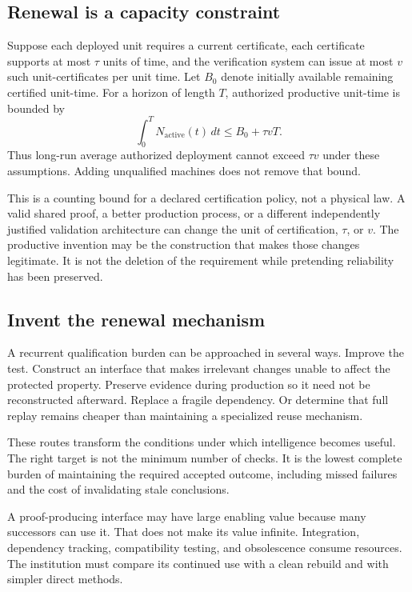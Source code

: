 \subsection{Renewal is a capacity constraint}
Suppose each deployed unit requires a current certificate, each certificate supports at most $\tau$ units of time, and the verification system can issue at most $v$ such unit-certificates per unit time. Let $B_0$ denote initially available remaining certified unit-time. For a horizon of length $T$, authorized productive unit-time is bounded by
\begin{equation}
 \int_0^T N_{\mathrm{active}}(t)\,dt\leq B_0+\tau vT.
 \label{eq:renewal}
\end{equation}
Thus long-run average authorized deployment cannot exceed $\tau v$ under these assumptions. Adding unqualified machines does not remove that bound.

This is a counting bound for a declared certification policy, not a physical law. A valid shared proof, a better production process, or a different independently justified validation architecture can change the unit of certification, $\tau$, or $v$. The productive invention may be the construction that makes those changes legitimate. It is not the deletion of the requirement while pretending reliability has been preserved.

\subsection{Invent the renewal mechanism}
A recurrent qualification burden can be approached in several ways. Improve the test. Construct an interface that makes irrelevant changes unable to affect the protected property. Preserve evidence during production so it need not be reconstructed afterward. Replace a fragile dependency. Or determine that full replay remains cheaper than maintaining a specialized reuse mechanism.

These routes transform the conditions under which intelligence becomes useful. The right target is not the minimum number of checks. It is the lowest complete burden of maintaining the required accepted outcome, including missed failures and the cost of invalidating stale conclusions.

A proof-producing interface may have large enabling value because many successors can use it. That does not make its value infinite. Integration, dependency tracking, compatibility testing, and obsolescence consume resources. The institution must compare its continued use with a clean rebuild and with simpler direct methods.

